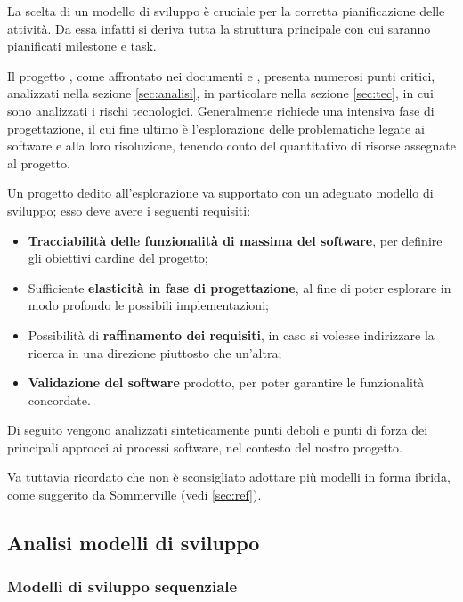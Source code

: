 	La scelta di un modello di sviluppo è cruciale per la corretta pianificazione delle attività. Da essa infatti si deriva tutta la struttura principale con cui saranno pianificati milestone e task.

	Il progetto {\proj}, come affrontato nei documenti {\SdF} e {\PdQ}, presenta numerosi punti critici, analizzati nella sezione {\ref{sec:analisi}}, in particolare nella sezione {\ref{sec:tec}}, in cui sono analizzati i rischi tecnologici. Generalmente {\proj} richiede una intensiva fase di progettazione, il cui fine ultimo è l'esplorazione delle problematiche legate ai software  e alla loro risoluzione, tenendo conto del quantitativo di risorse assegnate al progetto. %

	Un progetto dedito all'esplorazione va supportato con un adeguato modello di sviluppo; esso deve avere i seguenti requisiti:

	\begin{itemize}
		\item \textbf{Tracciabilità delle funzionalità di massima del software}, per definire gli obiettivi cardine del progetto;
		\item Sufficiente \textbf{elasticità in fase di progettazione}, al fine di poter esplorare in modo profondo le possibili implementazioni;
		\item Possibilità di \textbf{raffinamento dei requisiti}, in caso si volesse indirizzare la ricerca in una direzione piuttosto che un'altra;
		\item \textbf{Validazione del software} prodotto, per poter garantire le funzionalità concordate.
	\end{itemize}

	Di seguito vengono analizzati sinteticamente punti deboli e punti di forza dei principali approcci ai processi software, nel contesto del nostro progetto.
	
	Va tuttavia ricordato che non è sconsigliato adottare più modelli in forma ibrida, come suggerito da Sommerville (vedi \ref{sec:ref}).

	\subsection{Analisi modelli di sviluppo}

		\subsubsection{Modelli di sviluppo sequenziale}

